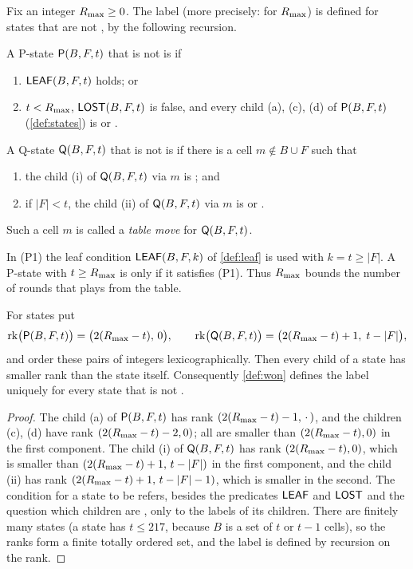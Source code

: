 \begin{definition}[\WON]\label{def:won}
Fix an integer $R_{\max}\ge 0$. The label \WON{} (more precisely: \WON{} for $R_{\max}$) is defined for states that
are not \VOID, by the following recursion.

A P-state $\mathsf{P}(B,F,t)$ that is not \VOID{} is \WON{} if
\begin{enumerate}[label=\textup{(P\arabic*)},leftmargin=3em]
\item $\mathsf{LEAF}(B,F,t)$ holds; or
\item $t<R_{\max}$, $\mathsf{LOST}(B,F,t)$ is false, and every child \textup{(a)}, \textup{(c)}, \textup{(d)} of
  $\mathsf{P}(B,F,t)$ (\cref{def:states}) is \WON{} or \VOID.
\end{enumerate}
A Q-state $\mathsf{Q}(B,F,t)$ that is not \VOID{} is \WON{} if there is a cell $m\notin B\cup F$ such that
\begin{enumerate}[label=\textup{(\roman*)},leftmargin=3em]
\item the child \textup{(i)} of $\mathsf{Q}(B,F,t)$ via $m$ is \WON; and
\item if $|F|<t$, the child \textup{(ii)} of $\mathsf{Q}(B,F,t)$ via $m$ is \WON{} or \VOID.
\end{enumerate}
Such a cell $m$ is called a \emph{table move} for $\mathsf{Q}(B,F,t)$.
\end{definition}

In (P1) the leaf condition $\mathsf{LEAF}(B,F,k)$ of \cref{def:leaf} is used with $k=t\ge|F|$. A P-state with
$t\ge R_{\max}$ is \WON{} only if it satisfies (P1). Thus $R_{\max}$ bounds the number of rounds that \Breaker{} plays
from the table.

\begin{lemma}\label{lem:rank}
For states put
\[ \operatorname{rk}\bigl(\mathsf{P}(B,F,t)\bigr)=\bigl(2(R_{\max}-t),\,0\bigr),\qquad
   \operatorname{rk}\bigl(\mathsf{Q}(B,F,t)\bigr)=\bigl(2(R_{\max}-t)+1,\;t-|F|\bigr), \]
and order these pairs of integers lexicographically. Then every child of a state has smaller rank than the
state itself. Consequently \cref{def:won} defines the label \WON{} uniquely for every state that is
not \VOID.
\end{lemma}

\begin{proof}
The child \textup{(a)} of $\mathsf{P}(B,F,t)$ has rank $(2(R_{\max}-t)-1,\,\cdot\,)$, and the children \textup{(c)},
\textup{(d)} have rank $(2(R_{\max}-t)-2,0)$; all are smaller than $(2(R_{\max}-t),0)$ in the first component. The
child \textup{(i)} of $\mathsf{Q}(B,F,t)$ has rank $(2(R_{\max}-t),0)$, which is smaller than
$(2(R_{\max}-t)+1,\,t-|F|)$ in the first component, and the child \textup{(ii)} has rank
$(2(R_{\max}-t)+1,\,t-|F|-1)$, which is smaller in the second. The condition for a state to be \WON{} refers,
besides the predicates $\mathsf{LEAF}$ and $\mathsf{LOST}$ and the question which children are \VOID, only to the labels of
its children. There are finitely many
states (a state has $t\le 217$, because $B$ is a set of $t$ or $t-1$ cells), so the ranks form a finite totally ordered set, and the label is defined by
recursion on the rank.
\end{proof}

